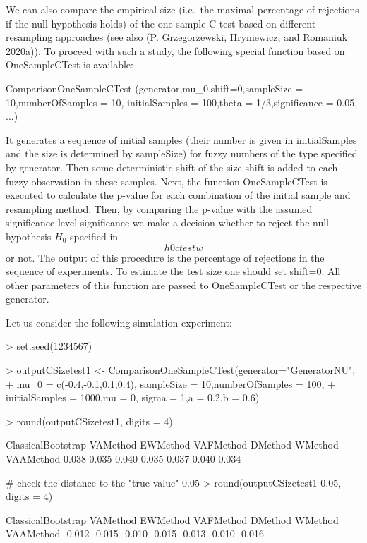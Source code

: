 We can also compare the empirical size (i.e.~the maximal percentage of
rejections if the null hypothesis holds) of the one-sample C-test based
on different resampling approaches (see also
(P. Grzegorzewski, Hryniewicz, and Romaniuk 2020a)). To proceed with such a study, the following
special function based on OneSampleCTest is available:

\begin{example}
ComparisonOneSampleCTest (generator,mu\_0,shift=0,sampleSize =
10,numberOfSamples = 10, initialSamples = 100,theta = 1/3,significance =
0.05, ...)
\end{example}

It generates a sequence of initial samples (their number is given in
initialSamples and the size is determined by sampleSize) for fuzzy
numbers of the type specified by generator. Then some deterministic
shift of the size shift is added to each fuzzy observation in these
samples. Next, the function OneSampleCTest is executed to calculate the
p-value for each combination of the initial sample and resampling
method. Then, by comparing the p-value with the assumed significance
level significance we make a decision whether to reject the null
hypothesis \(H_0\) specified in
\protect\hyperlink{h0ctestw}{\[h0ctestw\]}
or not. The output of this procedure is the percentage of rejections in
the sequence of experiments. To estimate the test size one should set
shift=0. All other parameters of this function are passed to
OneSampleCTest or the respective generator.

Let us consider the following simulation experiment:

\begin{example}
\textgreater{} set.seed(1234567)

\textgreater{} outputCSizetest1 \textless-
ComparisonOneSampleCTest(generator="GeneratorNU", + mu\_0 =
c(-0.4,-0.1,0.1,0.4), sampleSize = 10,numberOfSamples = 100, +
initialSamples = 1000,mu = 0, sigma = 1,a = 0.2,b = 0.6)

\textgreater{} round(outputCSizetest1, digits = 4)

ClassicalBootstrap VAMethod EWMethod VAFMethod DMethod WMethod VAAMethod
0.038 0.035 0.040 0.035 0.037 0.040 0.034

\# check the distance to the "true value" 0.05 \textgreater{}
round(outputCSizetest1-0.05, digits = 4)

ClassicalBootstrap VAMethod EWMethod VAFMethod DMethod WMethod VAAMethod
-0.012 -0.015 -0.010 -0.015 -0.013 -0.010 -0.016
\end{example}

